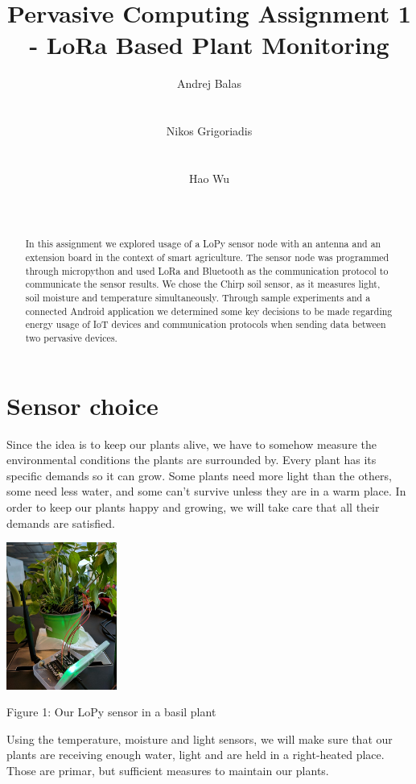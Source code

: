 \documentclass[10pt]{sensys-proc}
\author{
%
\alignauthor Andrej Balas \\
        \affaddr{Msc. Software Development Design}\\
        \affaddr{IT University Copenhagen}\\
       \email{bala@itu.dk}
\alignauthor Nikos Grigoriadis \\
        \affaddr{Msc. Software Development Design}\\
        \affaddr{IT University Copenhagen}\\
    \email{ngri@itu.dk}
\alignauthor Hao Wu \\
        \affaddr{Msc. Software Development Design}\\
        \affaddr{IT University Copenhagen}\\
    \email{hawu@itu.dk}
}
\title{Pervasive Computing Assignment 1 - LoRa Based Plant Monitoring}
\begin{document}
\maketitle

\begin{abstract}

In this assignment we explored usage of a LoPy sensor node with an antenna and an extension board in the context of smart agriculture. The sensor node was programmed through micropython and used LoRa and Bluetooth as the communication protocol to communicate the sensor results. We chose the Chirp soil sensor, as it measures light, soil moisture and temperature simultaneously. Through sample experiments and a connected Android application we determined some key decisions to be made regarding energy usage of IoT devices and communication protocols when sending data between two pervasive devices. 
\bigskip
\end{abstract}
\section{Sensor choice}
Since the idea is to keep our plants alive, we have to somehow measure the environmental conditions the plants are surrounded by. Every plant has its specific demands so it can grow. Some plants need more light than the others, some need less water, and some can't survive unless they are in a warm place. In order to keep our plants happy and growing, we will take care that all their demands are satisfied. 


\includegraphics[height=1.9in]{./Images/figure2}

Figure 1: Our LoPy sensor in a basil plant

Using the temperature, moisture and light sensors, we will make sure that our plants are receiving enough water, light and are held in a right-heated place. Those are primar, but sufficient measures to maintain our plants.
\bigskip
\end{document}
